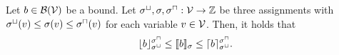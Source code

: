 \begin{theorem}
  Let $b \in \mathcal{B}(\mathcal{V})$ be a bound.
  Let ${\sigma^\sqcup}, \sigma, {\sigma^\sqcap}: \mathcal{V} \rightarrow \mathbb{Z}$ be three assignments with ${\sigma^\sqcup}(v) \leq \sigma(v) \leq {\sigma^\sqcap}(v)$ for each variable $v \in \mathcal{V}$.
  Then, it holds that
  \[ \lfloor b \rfloor^{{\sigma^\sqcap}}_{{\sigma^\sqcup}} \leq \llbracket b \rrbracket_{\sigma} \leq \lceil b \rceil^{{\sigma^\sqcap}}_{{\sigma^\sqcup}}. \]
\end{theorem}
